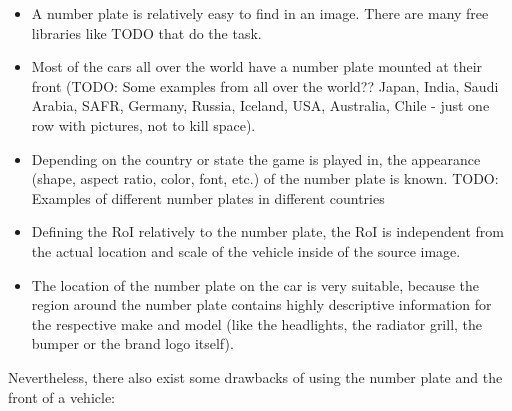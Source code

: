 \begin{itemize}
  \item A number plate is relatively easy to find in an image. There are many free libraries like TODO that do the task.
  \item Most of the cars all over the world have a number plate mounted at their front (TODO: Some examples from all over the world?? Japan, India, Saudi Arabia, SAFR, Germany, Russia, Iceland, USA, Australia, Chile - just one row with pictures, not to kill space).
  \item Depending on the country or state the game is played in, the appearance (shape, aspect ratio, color, font, etc.) of the number plate is known. TODO: Examples of different number plates in different countries
  \item Defining the RoI relatively to the number plate, the RoI is independent from the actual location and scale of the vehicle inside of the source image.
  \item The location of the number plate on the car is very suitable, because the region around the number plate contains highly descriptive information for the respective make and model (like the headlights, the radiator grill, the bumper or the brand logo itself).
\end{itemize}
Nevertheless, there also exist some drawbacks of using the number plate and the front of a vehicle:

